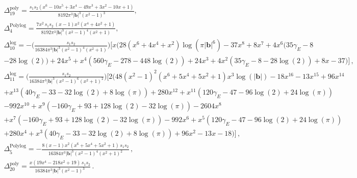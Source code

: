 \begin{thesiscompactdisplay}
\begin{align}
\begin{split}
&\Delta_{\mathfrak{19}}^{\textrm{poly}}=\frac{s_{1} s_{2} \left(x^6-10 x^5+3 x^4-49 x^3+3 x^2-10 x+1\right)}{8192 \pi ^3 |\boldsymbol{b}|^3 \left(x^2-1\right)^3},\\ &
\Delta_{\mathfrak{4}}^{\textrm{Polylog}}=\frac{7 x^2\,s_1s_2\, (x-1) x^2 \left(x^4+4 x^2+1\right)}{8192 \pi ^3 |\boldsymbol{b}|^3 \left(x^2-1\right)^4 \left(x^2+1\right)},\\ &
\Delta_{\mathfrak{10}}^{\textrm{log}}=-\Bigg(\frac{s_1s_2}{{16384 \pi ^3 |\boldsymbol{b}|^3 \left(x^2-1\right)^4 \left(x^2+1\right)}}\Bigg)\Bigg[x \big(28 \left(x^6+4 x^4+x^2\right) \log \left(\pi  |\boldsymbol{b}|^6\right)-37 x^8+8 x^7+4 x^6 (35 \gamma_E -8\\&-28 \log (2))+24 x^5+x^4 (560 \gamma_E -278-448 \log (2))+24 x^3+4 x^2 (35 \gamma_E -8-28 \log (2))+8 x-37\big)\Bigg]\,,\\ &
\Delta_{\mathfrak{11}}^{\textrm{log}}=\Bigg(\frac{s_1s_2}{16384 \pi ^3 |\boldsymbol{b}|^3 \left(x^2-1\right)^6 \left(x^2+1\right)^2}\Bigg)\Bigg[2 \big(48 \left(x^2-1\right)^2 \left(x^6+5 x^4+5 x^2+1\right) x^3 \log ( |\boldsymbol{b}|)-18 x^{16}-13 x^{15}+96 x^{14}\\
&+x^{13} (40 \gamma_E -33-32 \log (2)+8 \log (\pi ))+280 x^{12}+x^{11} (120 \gamma_E -47-96 \log (2)+24 \log (\pi ))\\
&-992 x^{10}+x^9 (-160 \gamma_E +93+128 \log (2)-32 \log (\pi ))-2604 x^8\\
&+x^7 (-160 \gamma_E +93+128 \log (2)-32 \log (\pi ))-992 x^6+x^5 (120 \gamma_E -47-96 \log (2)+24 \log (\pi ))\\
&+280 x^4+x^3 (40 \gamma_E -33-32 \log (2)+8 \log (\pi ))+96 x^2-13 x-18\big)\Bigg]\,,\\ &
\Delta_{\mathfrak{5}}^{\textrm{Polylog}}=-\frac{8 (x-1) x^2 \left(x^6+5 x^4+5 x^2+1\right)\, s_1s_2}{16384 \pi ^3 |\boldsymbol{b}|^3 \left(x^2-1\right)^4 \left(x^2+1\right)^2}\,,\\ &
\Delta_{\mathfrak{20}}^{\textrm{poly}}=\frac{x  \left(19 x^4-218 x^2+19\right)\,s_1s_2}{16384 \pi ^3 |\boldsymbol{b}|^3 \left(x^2-1\right)^3 }\,.
\end{split}
\end{align}
\end{thesiscompactdisplay}

